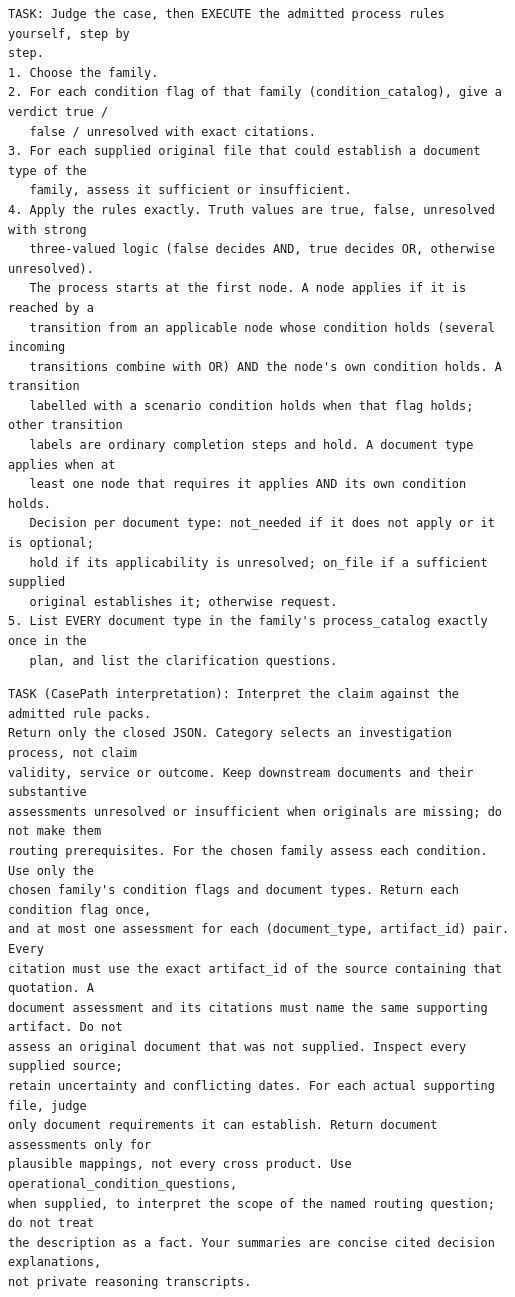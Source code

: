 \begin{lstlisting}[title={\textbf{Model executes rules (tenancy)}}]
TASK: Judge the case, then EXECUTE the admitted process rules yourself, step by
step.
1. Choose the family.
2. For each condition flag of that family (condition_catalog), give a verdict true /
   false / unresolved with exact citations.
3. For each supplied original file that could establish a document type of the
   family, assess it sufficient or insufficient.
4. Apply the rules exactly. Truth values are true, false, unresolved with strong
   three-valued logic (false decides AND, true decides OR, otherwise unresolved).
   The process starts at the first node. A node applies if it is reached by a
   transition from an applicable node whose condition holds (several incoming
   transitions combine with OR) AND the node's own condition holds. A transition
   labelled with a scenario condition holds when that flag holds; other transition
   labels are ordinary completion steps and hold. A document type applies when at
   least one node that requires it applies AND its own condition holds.
   Decision per document type: not_needed if it does not apply or it is optional;
   hold if its applicability is unresolved; on_file if a sufficient supplied
   original establishes it; otherwise request.
5. List EVERY document type in the family's process_catalog exactly once in the
   plan, and list the clarification questions.
\end{lstlisting}

\begin{lstlisting}[title={\textbf{CasePath interpretation (tenancy, product instructions restricted to conditions and documents)}}]
TASK (CasePath interpretation): Interpret the claim against the admitted rule packs.
Return only the closed JSON. Category selects an investigation process, not claim
validity, service or outcome. Keep downstream documents and their substantive
assessments unresolved or insufficient when originals are missing; do not make them
routing prerequisites. For the chosen family assess each condition. Use only the
chosen family's condition flags and document types. Return each condition flag once,
and at most one assessment for each (document_type, artifact_id) pair. Every
citation must use the exact artifact_id of the source containing that quotation. A
document assessment and its citations must name the same supporting artifact. Do not
assess an original document that was not supplied. Inspect every supplied source;
retain uncertainty and conflicting dates. For each actual supporting file, judge
only document requirements it can establish. Return document assessments only for
plausible mappings, not every cross product. Use operational_condition_questions,
when supplied, to interpret the scope of the named routing question; do not treat
the description as a fact. Your summaries are concise cited decision explanations,
not private reasoning transcripts.
\end{lstlisting}

